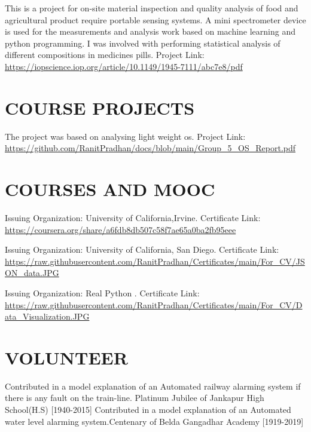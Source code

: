 \documentclass[11pt,a4paper,sans]{moderncv}        %
\begin{document}
{This is a project for on-site material inspection and quality analysis of food and agricultural product require portable sensing systems. A mini spectrometer device is used for the measurements and analysis work based on machine learning and python programming. I was involved with performing statistical analysis of different compositions in medicines pills. Project Link: {\newline}
\url{https://iopscience.iop.org/article/10.1149/1945-7111/abc7e8/pdf}}{}

\section{COURSE PROJECTS}

{The project was based on analysing light weight os. Project Link:   {\newline}
\url{https://github.com/RanitPradhan/docs/blob/main/Group_5_OS_Report.pdf}}{}


\section{COURSES AND MOOC}
{Issuing Organization: University of California,Irvine.{\newline}
Certificate Link:
\url{ https://coursera.org/share/a6fdb8db507c58f7ae65a0ba2fb95eee}}{}

{Issuing Organization: University of California, San Diego.{\newline}
Certificate Link:
\url{https://raw.githubusercontent.com/RanitPradhan/Certificates/main/For_CV/JSON_data.JPG}}{}

{Issuing Organization: Real Python .{\newline}
Certificate Link: 
\url{https://raw.githubusercontent.com/RanitPradhan/Certificates/main/For_CV/Data_Visualization.JPG}}{}



\section{VOLUNTEER}
{Contributed in a model explanation of an Automated railway alarming system if there is any fault on the train-line. 
Platinum Jubilee of Jankapur High School(H.S) [1940-2015]}
{Contributed in a model explanation of an Automated water level alarming system.Centenary of Belda Gangadhar Academy  [1919-2019]}
\end{document}
